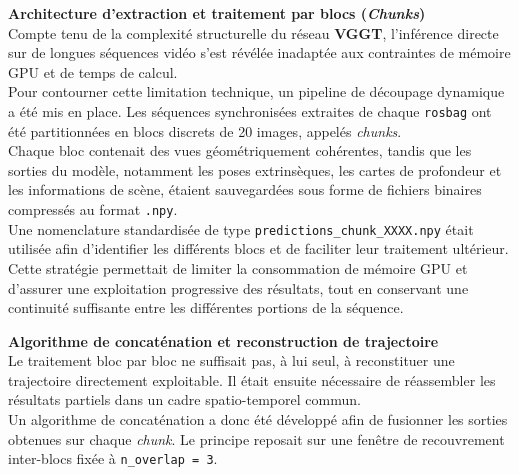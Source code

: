 \documentclass[12pt,a4paper,oneside]{report}
\begin{document}
\hspace*{0.4cm}\textbf{Architecture d'extraction et traitement par blocs (\textit{Chunks})}\\

\hspace*{.3cm}Compte tenu de la complexité structurelle du réseau \textbf{VGGT}, l'inférence directe sur de longues séquences vidéo s'est révélée inadaptée aux contraintes de mémoire GPU et de temps de calcul.\\

\hspace*{.3cm}Pour contourner cette limitation technique, un pipeline de découpage dynamique a été mis en place. Les séquences synchronisées extraites de chaque \texttt{rosbag} ont été partitionnées en blocs discrets de 20 images, appelés \textit{chunks}.\\
\hspace*{.3cm}Chaque bloc contenait des vues géométriquement cohérentes, tandis que les sorties du modèle, notamment les poses extrinsèques, les cartes de profondeur et les informations de scène, étaient sauvegardées sous forme de fichiers binaires compressés au format \texttt{.npy}.\\

\hspace*{.3cm}Une nomenclature standardisée de type \texttt{predictions\_chunk\_XXXX.npy} était utilisée afin d'identifier les différents blocs et de faciliter leur traitement ultérieur.\\
Cette stratégie permettait de limiter la consommation de mémoire GPU et d'assurer une exploitation progressive des résultats, tout en conservant une continuité suffisante entre les différentes portions de la séquence.

\newpage

\hspace*{0.4cm}\textbf{Algorithme de concaténation et reconstruction de trajectoire}\\

\hspace*{.3cm}Le traitement bloc par bloc ne suffisait pas, à lui seul, à reconstituer une trajectoire directement exploitable. Il était ensuite nécessaire de réassembler les résultats partiels dans un cadre spatio-temporel commun.\\
\hspace*{.3cm}Un algorithme de concaténation a donc été développé afin de fusionner les sorties obtenues sur chaque \textit{chunk}. Le principe reposait sur une fenêtre de recouvrement inter-blocs fixée à \texttt{n\_overlap = 3}.\\
\end{document}
